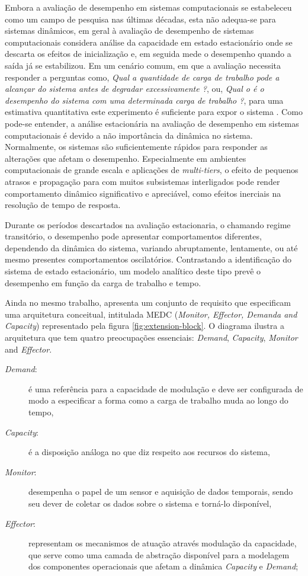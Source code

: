 Embora a avaliação de desempenho em sistemas computacionais se estabeleceu como um campo de pesquisa nas últimas décadas, esta não adequa-se para sistemas dinâmicos, em geral à avaliação de desempenho de sistemas computacionais considera análise da capacidade em estado estacionário onde se descarta os efeitos de inicialização e, em seguida mede o desempenho quando a saída já se estabilizou. Em um cenário comum, em que a avaliação necessita responder a perguntas como, \textit{Qual a quantidade de carga de trabalho pode a alcançar do sistema antes de degradar excessivamente ?}, ou, \textit{Qual o é o desempenho do sistema com uma determinada carga de trabalho ?}, para uma estimativa quantitativa este experimento é suficiente para expor o sistema \cite{Lourenco2015}.
Como pode-se entender, a análise estacionária na avaliação de desempenho em sistemas computacionais é devido a não importância da dinâmica no sistema. Normalmente, os sistemas são suficientemente rápidos para responder as alterações que afetam o desempenho. Especialmente em ambientes computacionais de grande escala e aplicações de \textit{multi-tiers}, o efeito de pequenos atrasos e propagação para com muitos subsistemas interligados pode render comportamento dinâmico significativo e apreciável, como efeitos inerciais na resolução de tempo de resposta.

Durante os períodos descartados na avaliação estacionaria, o chamando regime transitório, o desempenho pode apresentar comportamentos diferentes, dependendo da dinâmica do sistema, variando abruptamente, lentamente, ou até mesmo presentes comportamentos oscilatórios. Contrastando a identificação do sistema de estado estacionário, um modelo analítico deste tipo prevê o desempenho em função da carga de trabalho e tempo.

Ainda no mesmo trabalho,  apresenta um conjunto de requisito que especificam uma arquitetura conceitual, intitulada MEDC (\textit{Monitor, Effector, Demanda and Capacity}) representado pela figura \ref{fig:extension-block}. O diagrama ilustra a arquitetura que tem quatro preocupações essenciais: \textit{Demand}, \textit{Capacity}, \textit{Monitor} and \textit{Effector}.

\begin{description}
	\item[\textit{Demand}:] é uma referência para a capacidade de modulação e deve ser configurada de modo a especificar a forma como a carga de trabalho muda ao longo do tempo,
	\item[\textit{Capacity}:]  é a disposição análoga no que diz respeito aos recursos do sistema,
	\item[\textit{Monitor}:] desempenha o papel de um sensor e aquisição de dados temporais, sendo seu dever de coletar os dados sobre o sistema e torná-lo disponível,
	\item[\textit{Effector}:] representam os mecanismos de atuação através modulação da capacidade, que serve como uma camada de abstração disponível para a modelagem dos componentes operacionais que afetam a dinâmica \textit{Capacity} e \textit{Demand};
\end{description}

